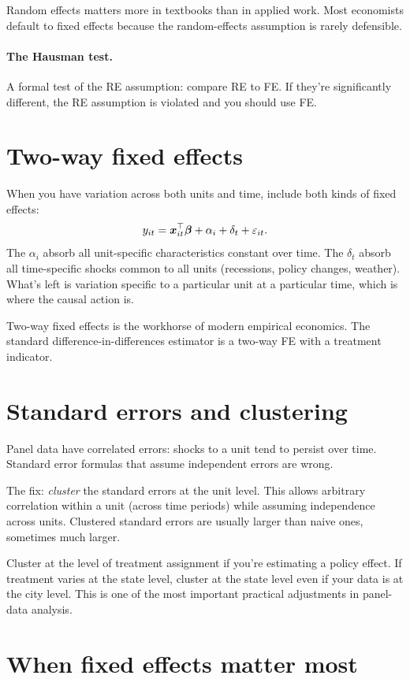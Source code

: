 Random effects matters more in textbooks than in applied work. Most economists default to fixed effects because the random-effects assumption is rarely defensible.

\paragraph{The Hausman test.} A formal test of the RE assumption: compare RE to FE. If they're significantly different, the RE assumption is violated and you should use FE.

\section{Two-way fixed effects}

When you have variation across both units and time, include both kinds of fixed effects:
\[
  y_{it} = \bm{x}_{it}^\top \bm{\beta} + \alpha_i + \delta_t + \varepsilon_{it}.
\]
The $\alpha_i$ absorb all unit-specific characteristics constant over time. The $\delta_t$ absorb all time-specific shocks common to all units (recessions, policy changes, weather). What's left is variation specific to a particular unit at a particular time, which is where the causal action is.

Two-way fixed effects is the workhorse of modern empirical economics. The standard difference-in-differences estimator is a two-way FE with a treatment indicator.

\section{Standard errors and clustering}

Panel data have correlated errors: shocks to a unit tend to persist over time. Standard error formulas that assume independent errors are wrong.

The fix: \emph{cluster} the standard errors at the unit level. This allows arbitrary correlation within a unit (across time periods) while assuming independence across units. Clustered standard errors are usually larger than naive ones, sometimes much larger.

Cluster at the level of treatment assignment if you're estimating a policy effect. If treatment varies at the state level, cluster at the state level even if your data is at the city level. This is one of the most important practical adjustments in panel-data analysis.

\section{When fixed effects matter most}

